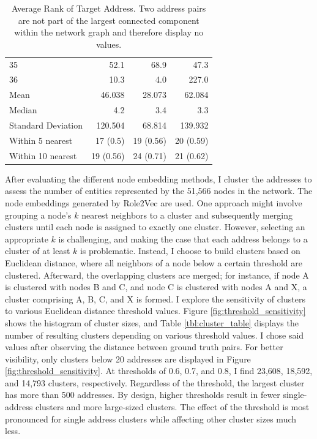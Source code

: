 \documentclass[12pt,a4paper,titlepage,oneside,english]{article}
\begin{document}
\begin{table}[h!]
\begin{tabular}{lrrr}
    35 & 52.1 & 68.9 & 47.3 \\
    36 & 10.3 & 4.0 & 227.0 \\
    \hline
    Mean & 46.038 & 28.073 & 62.084 \\
    Median & 4.2 & 3.4 & 3.3 \\
    Standard Deviation & 120.504 & 68.814 &  139.932\\
    Within 5 nearest & 17 (0.5) & 19 (0.56) & 20 (0.59) \\
    Within 10 nearest & 19 (0.56) & 24 (0.71) & 21 (0.62)\\
    \hline
  \end{tabular}
  \caption{Average Rank of Target Address. Two address pairs are not part of the largest connected component within the network graph and therefore display no values.}
  \label{tbl:ENS_Domain_Ranks}
\end{table}

After evaluating the different node embedding methods, I cluster the addresses to assess the number of entities represented by the 51,566 nodes in the network. The node embeddings generated by Role2Vec are used. \newline
One approach might involve grouping a node's $k$ nearest neighbors to a cluster and subsequently merging clusters until each node is assigned to exactly one cluster. However, selecting an appropriate $k$ is challenging, and making the case that each address belongs to a cluster of at least $k$ is problematic. \newline
Instead, I choose to build clusters based on Euclidean distance, where all neighbors of a node below a certain threshold are clustered. Afterward, the overlapping clusters are merged; for instance, if node A is clustered with nodes B and C, and node C is clustered with nodes A and X, a cluster comprising A, B, C, and X is formed. \newline
I explore the sensitivity of clusters to various Euclidean distance threshold values. Figure \ref{fig:threshold_sensitivity} shows the histogram of cluster sizes, and Table \ref{tbl:cluster_table} displays the number of resulting clusters depending on various threshold values. I chose said values after observing the distance between ground truth pairs. For better visibility, only clusters below 20 addresses are displayed in Figure \ref{fig:threshold_sensitivity}. At thresholds of 0.6, 0.7, and 0.8, I find 23,608, 18,592, and 14,793 clusters, respectively. Regardless of the threshold, the largest cluster has more than 500 addresses. By design, higher thresholds result in fewer single-address clusters and more large-sized clusters. The effect of the threshold is most pronounced for single address clusters while affecting other cluster sizes much less. 
\end{document}
